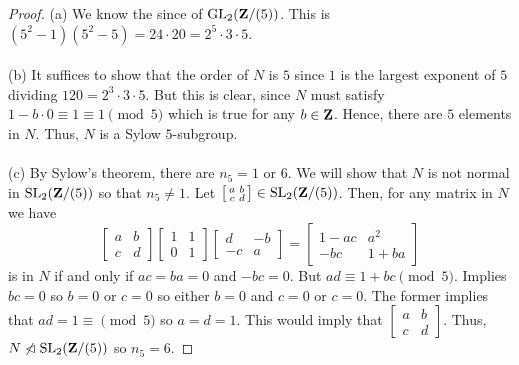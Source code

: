 \begin{proof}
(a) We know the since of $\operatorname{GL}_2(\mathbf{Z}/(5))$. This is $(5^2-1)(5^2-5)=24\cdot
20=2^5\cdot 3\cdot 5$.
\\\\
(b) It suffices to show that the order of $N$ is $5$ since $1$ is the
largest exponent of $5$ dividing $120=2^3\cdot 3\cdot 5$. But this is
clear, since $N$ must satisfy $1-b\cdot 0\equiv 1\equiv 1\pmod{5}$ which is
true for any $b\in\mathbf{Z}$. Hence, there are $5$ elements in $N$. Thus, $N$ is
a Sylow $5$-subgroup.
\\\\
(c) By Sylow's theorem, there are $n_5=1$ or $6$. We will show that $N$ is
not normal in $\operatorname{SL}_2(\mathbf{Z}/(5))$ so that $n_5\neq 1$. Let
$\left[\begin{smallmatrix}a&b\\c&d\end{smallmatrix}\right]\in\operatorname{SL}_2(\mathbf{Z}/(5))$. Then,
for any matrix in $N$ we have
\[
\begin{bmatrix}
a&b\\c&d
\end{bmatrix}
\begin{bmatrix}
1&1\\0&1
\end{bmatrix}
\begin{bmatrix}
d&-b\\
-c&a
\end{bmatrix}
=
\begin{bmatrix}
1-ac&a^2\\-bc&1+ba
\end{bmatrix}
\]
is in $N$ if and only if $ac=ba=0$ and $-bc=0$. But $ad\equiv
1+bc\pmod{5}$. Implies $bc=0$ so $b=0$ or $c=0$ so either $b=0$ and $c=0$
or $c=0$. The former implies that $ad=1\equiv\pmod{5}$ so $a=d=1$. This
would imply that
$\left[\begin{smallmatrix}a&b\\c&d\end{smallmatrix}\right]$. Thus,
$N\nlhd\SL_2(\bfZ/(5))$ so $n_5=6$.
\end{proof}

